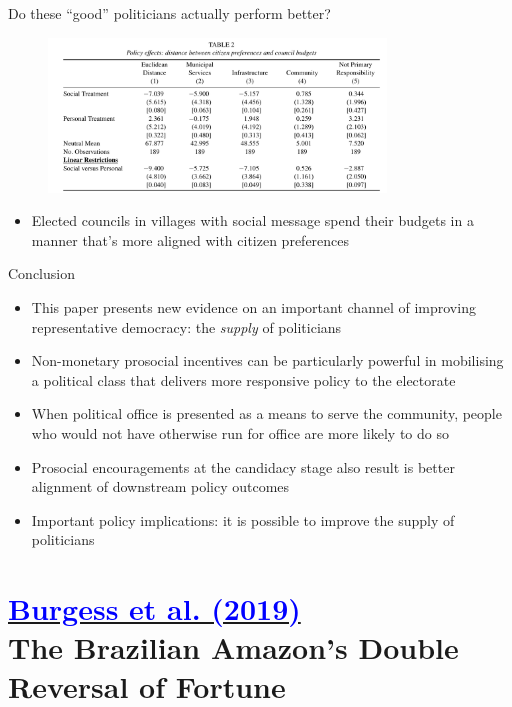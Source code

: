 \documentclass[11pt,notes=hide,aspectratio=169,mathserif]{beamer}
\begin{document}
\begin{frame}{Do these ``good'' politicians actually perform better?}
    \begin{figure}
        \centering
        \includegraphics[width=0.8\textwidth]{inputs/table2.png}
        \end{figure}
\begin{itemize}
\item Elected councils in villages with social message spend their budgets in a manner that's more aligned with citizen preferences
\end{itemize}
\end{frame}

\begin{frame}{Conclusion}
\begin{itemize}
\item This paper presents new evidence on an important channel of improving representative democracy: the \textit{supply} of politicians
\item Non-monetary prosocial incentives can be particularly powerful in mobilising a political class that delivers more responsive policy to the electorate
\item When political office is presented as a means to serve the community, people who would not have otherwise run for office are more likely to do so
\item Prosocial encouragements at the candidacy stage also result is better alignment of downstream policy outcomes
\item Important policy implications: it is possible to improve the supply of politicians
\end{itemize}
\end{frame}

\section*{\href{https://www.lse.ac.uk/economics/Assets/Documents/personal-pages/robin-burgess/the-brazilian-amazons-double-reversal-of-fortune-manuscript.pdf}{\textcolor{blue}{Burgess et al. (2019)}} \\[5mm] 
\textnormal{\small{The Brazilian Amazon’s Double Reversal of Fortune}}}
\end{document}
